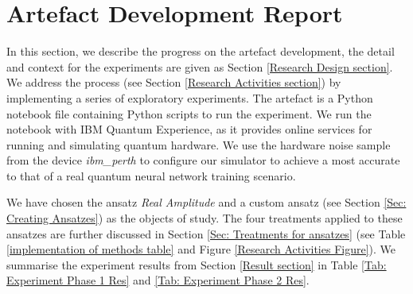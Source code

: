\section{Artefact Development Report}
\label{Minimum Artefact section}
In this section, we describe the progress on the artefact development, the detail and context for the experiments are given as Section \ref{Research Design section}.
We address the process (see Section \ref{Research Activities section}) by implementing a series of exploratory experiments.
The artefact is a Python notebook file containing Python scripts to run the experiment.
We run the notebook with IBM Quantum Experience, as it provides online services for running and simulating quantum hardware.
We use the hardware noise sample from the device \emph{ibm\_perth} to configure our simulator to achieve a most accurate to that of a real quantum neural network training scenario.

We have chosen the ansatz \emph{Real Amplitude} and a custom ansatz (see Section \ref{Sec: Creating Ansatzes}) as the objects of study.
The four treatments applied to these ansatzes are further discussed in Section \ref{Sec: Treatments for ansatzes} (see Table \ref{implementation of methods table} and Figure \ref{Research Activities Figure}).
We summarise the experiment results from Section \ref{Result section} in Table \ref{Tab: Experiment Phase 1 Res} and \ref{Tab: Experiment Phase 2 Res}.
















